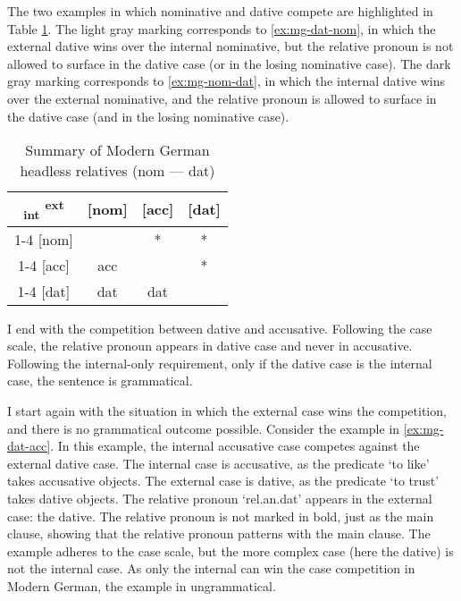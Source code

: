 The two examples in which nominative and dative compete are highlighted in Table \ref{tbl:case-competition-mg-nom-dat}. The light gray marking corresponds to \ref{ex:mg-dat-nom}, in which the external dative wins over the internal nominative, but the relative pronoun is not allowed to surface in the dative case (or in the losing nominative case). The dark gray marking corresponds to \ref{ex:mg-nom-dat}, in which the internal dative wins over the external nominative, and the relative pronoun is allowed to surface in the dative case (and in the losing nominative case).

\begin{table}[H]
  \center
  \caption{Summary of Modern German headless relatives (\ac{nom} --- \ac{dat})}
  \begin{tabular}{c|c|c|c}
    \toprule
    \textsubscript{\ac{int}} \textsuperscript{\ac{ext}}
           & [\ac{nom}]
           & [\ac{acc}]
           & [\ac{dat}]
           \\ \cmidrule{1-4}
       [\ac{nom}]
           & \xcancel{\phantom{xx}}
           & *
           & \cellcolor{LG}*
           \\ \cmidrule{1-4}
       [\ac{acc}]
           & \ac{acc}
           & \xcancel{\phantom{xx}}
           & *
           \\ \cmidrule{1-4}
       [\ac{dat}]
           & \cellcolor{DG}\ac{dat}
           & \ac{dat}
           & \xcancel{\phantom{xx}}
           \\
     \bottomrule
  \end{tabular}
    \label{tbl:case-competition-mg-nom-dat}
\end{table}

I end with the competition between dative and accusative. Following the case scale, the relative pronoun appears in dative case and never in accusative. Following the internal-only requirement, only if the dative case is the internal case, the sentence is grammatical.

I start again with the situation in which the external case wins the competition, and there is no grammatical outcome possible.
Consider the example in \ref{ex:mg-dat-acc}. In this example, the internal accusative case competes against the external dative case.
The internal case is accusative, as the predicate  `to like' takes accusative objects.
The external case is dative, as the predicate  `to trust' takes dative objects.
The relative pronoun  `\ac{rel}.\ac{an}.\ac{dat}' appears in the external case: the dative. The relative pronoun is not marked in bold, just as the main clause, showing that the relative pronoun patterns with the main clause.
The example adheres to the case scale, but the more complex case (here the dative) is not the internal case. As only the internal can win the case competition in Modern German, the example in ungrammatical.

